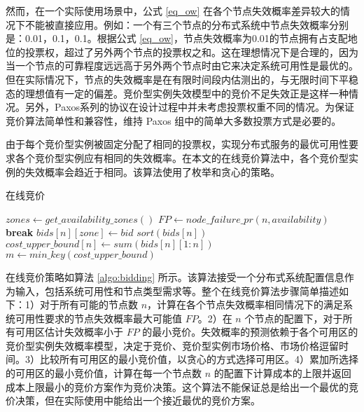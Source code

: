 然而，在一个实际使用场景中，公式 \eqref{eq_ow} 在各个节点失效概率差异较大的情况下不能被直接应用。例如：一个有三个节点的分布式系统中节点失效概率分别是：0.01，0.1，0.1。根据公式 \eqref{eq_ow}，节点失效概率为0.01的节点拥有占支配地位的投票权，超过了另外两个节点的投票权之和。这在理想情况下是合理的，因为当一个节点的可靠程度远远高于另外两个节点时由它来决定系统可用性是最优的。但在实际情况下，节点的失效概率是在有限时间段内估测出的，与无限时间下平稳态的理想值有一定的偏差。竞价型实例失效模型中的竞价不足失效正是这样一种情况。另外，Paxos系列的协议在设计过程中并未考虑投票权重不同的情况。为保证竞价算法简单性和兼容性，维持 Paxos 组中的简单大多数投票方式是必要的。

由于每个竞价型实例被固定分配了相同的投票权，实现分布式服务的最优可用性要求各个竞价型实例应有相同的失效概率。在本文的在线竞价算法中，各个竞价型实例的失效概率会趋近于相同。该算法使用了枚举和贪心的策略。

\begin{algorithm}
\caption{在线竞价}
\label{algo:bidding}
$zones\gets get\_availability\_zones()$
{
  $FP\gets node\_failure\_pr(n, availability)$
  {
    \ForEach{$bid \in [zone.spot\_prices[1], zone.on\_demand\_price)$}
    {
      {
        \textbf{break}
      }
    }
    $bids[n][zone]\gets bid$\;
  }
  $sort(bids[n])$\;
  $cost\_upper\_bound[n]\gets sum(bids[n][1:n])$\;
}
$m\gets min\_key(cost\_upper\_bound)$\;
\;
\end{algorithm}

在线竞价策略如算法 \ref{algo:bidding} 所示。该算法接受一个分布式系统配置信息作为输入，包括系统可用性和节点类型需求等。整个在线竞价算法步骤简单描述如下：1）对于所有可能的节点数 $n$，计算在各个节点失效概率相同情况下的满足系统可用性要求的节点失效概率最大可能值 $FP$。2）在 $n$ 个节点的配置下，对于所有可用区估计失效概率小于 $FP$ 的最小竞价。失效概率的预测依赖于各个可用区的竞价型实例失效概率模型，决定于竞价、竞价型实例市场价格、市场价格逗留时间。3）比较所有可用区的最小竞价值，以贪心的方式选择可用区。4）累加所选择的可用区的最小竞价值，计算在每一个节点数 $n$ 的配置下计算成本的上限并返回成本上限最小的竞价方案作为竞价决策。这个算法不能保证总是给出一个最优的竞价决策，但在实际使用中能给出一个接近最优的竞价方案。

